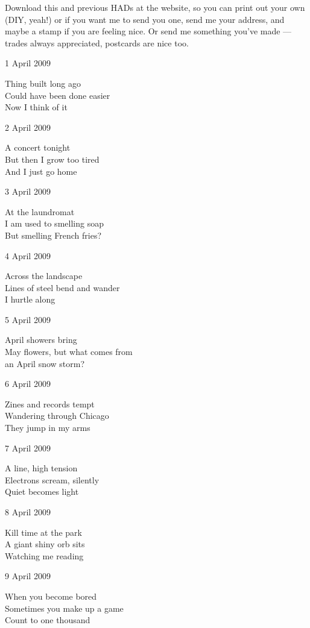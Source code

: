 \documentclass[12pt]{article}
\begin{document}
Download this and previous HADs at the website, so you can
print out your own (DIY, yeah!) or if you want me to send
you one, send me your address, and maybe a stamp if you
are feeling nice. Or send me something you've made ---
trades always appreciated, postcards are nice too.

1 April 2009

Thing built long ago \\
Could have been done easier \\
Now I think of it

2 April 2009

A concert tonight \\
But then I grow too tired \\
And I just go home

\newpage

3 April 2009

At the laundromat \\
I am used to smelling soap \\
But smelling French fries?

4 April 2009

Across the landscape \\
Lines of steel bend and wander \\
I hurtle along

5 April 2009

April showers bring \\
May flowers, but what comes from \\
an April snow storm?

6 April 2009

Zines and records tempt \\
Wandering through Chicago \\
They jump in my arms

7 April 2009

A line, high tension \\
Electrons scream, silently \\
Quiet becomes light

8 April 2009

Kill time at the park \\
A giant shiny orb sits \\
Watching me reading

9 April 2009

When you become bored \\
Sometimes you make up a game \\
Count to one thousand
\end{document}
